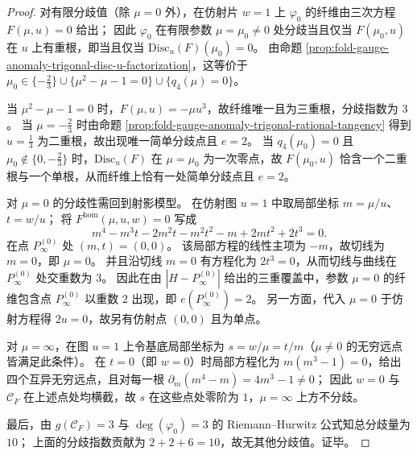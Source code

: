 \begin{proof}
对有限分歧值（除 \(\mu=0\) 外），在仿射片 \(w=1\) 上 \(\varphi_0\) 的纤维由三次方程 \(F(\mu,u)=0\) 给出；
因此 \(\varphi_0\) 在有限参数 \(\mu=\mu_0\neq 0\) 处分歧当且仅当 \(F(\mu_0,u)\) 在 \(u\) 上有重根，即当且仅当 \(\mathrm{Disc}_{u}(F)(\mu_0)=0\)。
由命题 \ref{prop:fold-gauge-anomaly-trigonal-disc-u-factorization}，这等价于
\(
\mu_0\in\{-\tfrac23\}\cup\{\mu^{2}-\mu-1=0\}\cup\{q_4(\mu)=0\}
\)。
\par
当 \(\mu^{2}-\mu-1=0\) 时，\(F(\mu,u)=-\mu u^{3}\)，故纤维唯一且为三重根，分歧指数为 \(3\)。
当 \(\mu=-\tfrac23\) 时由命题 \ref{prop:fold-gauge-anomaly-trigonal-rational-tangency} 得到 \(u=\tfrac13\) 为二重根，故出现唯一简单分歧点且 \(e=2\)。
当 \(q_4(\mu_0)=0\) 且 \(\mu_0\notin\{0,-\tfrac23\}\) 时，\(\mathrm{Disc}_{u}(F)\) 在 \(\mu=\mu_0\) 为一次零点，故 \(F(\mu_0,u)\) 恰含一个二重根与一个单根，从而纤维上恰有一处简单分歧点且 \(e=2\)。
\par
对 \(\mu=0\) 的分歧性需回到射影模型。
在仿射图 \(u=1\) 中取局部坐标 \(m=\mu/u\)、\(t=w/u\)；
将 \(F^{\mathrm{hom}}(\mu,u,w)=0\) 写成
\[
m^{4}-m^{3}t-2m^{2}t-m^{2}t^{2}-m+2mt^{2}+2t^{3}=0.
\]
在点 \(P_\infty^{(0)}\) 处 \((m,t)=(0,0)\)。
该局部方程的线性主项为 \(-m\)，故切线为 \(m=0\)，即 \(\mu=0\)。
并且沿切线 \(m=0\) 有方程化为 \(2t^{3}=0\)，从而切线与曲线在 \(P_\infty^{(0)}\) 处交重数为 \(3\)。
因此在由 \(|H-P_\infty^{(0)}|\) 给出的三重覆盖中，参数 \(\mu=0\) 的纤维包含点 \(P_\infty^{(0)}\) 以重数 \(2\) 出现，即 \(e(P_\infty^{(0)})=2\)。
另一方面，代入 \(\mu=0\) 于仿射方程得 \(2u=0\)，故另有仿射点 \((0,0)\) 且为单点。
\par
对 \(\mu=\infty\)，在图 \(u=1\) 上令基底局部坐标为 \(s=w/\mu=t/m\)（\(\mu\neq 0\) 的无穷远点皆满足此条件）。
在 \(t=0\)（即 \(w=0\)）时局部方程化为 \(m(m^{3}-1)=0\)，给出四个互异无穷远点，且对每一根 \(\partial_{m}(m^{4}-m)=4m^{3}-1\neq 0\)；
因此 \(w=0\) 与 \(\mathcal C_F\) 在上述点处均横截，故 \(s\) 在这些点处零阶为 \(1\)，\(\mu=\infty\) 上方不分歧。
\par
最后，由 \(g(\mathcal C_F)=3\) 与 \(\deg(\varphi_0)=3\) 的 Riemann--Hurwitz 公式知总分歧量为 \(10\)；
上面的分歧指数贡献为 \(2+2+6=10\)，故无其他分歧值。证毕。
\end{proof}

